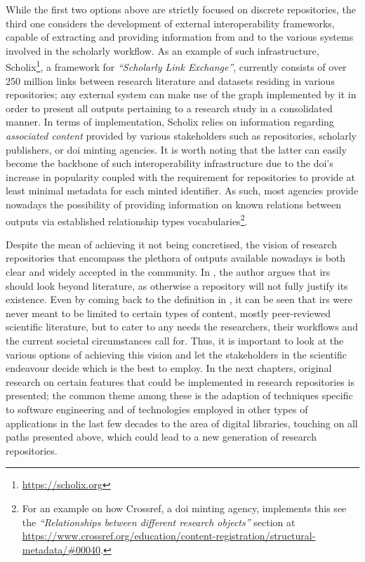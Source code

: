 While the first two options above are strictly focused on discrete repositories, the third one considers the development of external interoperability frameworks, capable of extracting and providing information from and to the various systems involved in the scholarly workflow. As an example of such infrastructure, Scholix\footnote{\url{https://scholix.org}}, a framework for \emph{``Scholarly Link Exchange''}, currently consists of over 250 million links between research literature and datasets residing in various repositories; any external system can make use of the graph implemented by it in order to present all outputs pertaining to a research study in a consolidated manner. In terms of implementation, Scholix relies on information regarding \emph{associated content} provided by various stakeholders such as repositories, scholarly publishers, or \gls{doi} minting agencies. It is worth noting that the latter can easily become the backbone of such interoperability infrastructure due to the \gls{doi}'s increase in popularity coupled with the requirement for repositories to provide at least minimal metadata for each minted identifier. As such, most agencies provide nowadays the possibility of providing information on known relations between outputs via established relationship types vocabularies\footnote{For an example on how Crossref, a \gls{doi} minting agency, implements this see the \emph{``Relationships between different research objects''} section at \url{https://www.crossref.org/education/content-registration/structural-metadata/\#00040}.}.

Despite the mean of achieving it not being concretised, the vision of research repositories that encompass the plethora of outputs available nowadays is both clear and widely accepted in the community. In \cite{salo}, the author argues that \glspl{ir} should look beyond literature, as otherwise a repository will not fully justify its existence. Even by coming back to the definition in \cite{lynch}, it can be seen that \glspl{ir} were never meant to be limited to certain types of content, mostly peer-reviewed scientific literature, but to cater to any needs the researchers, their workflows and the current societal circumstances call for. Thus, it is important to look at the various options of achieving this vision and let the stakeholders in the scientific endeavour decide which is the best to employ. In the next chapters, original research on certain features that could be implemented in research repositories is presented; the common theme among these is the adaption of techniques specific to software engineering and of technologies employed in other types of applications in the last few decades to the area of digital libraries, touching on all paths presented above, which could lead to a new generation of research repositories.
